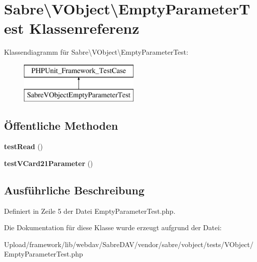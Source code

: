 \hypertarget{class_sabre_1_1_v_object_1_1_empty_parameter_test}{}\section{Sabre\textbackslash{}V\+Object\textbackslash{}Empty\+Parameter\+Test Klassenreferenz}
\label{class_sabre_1_1_v_object_1_1_empty_parameter_test}
Klassendiagramm für Sabre\textbackslash{}V\+Object\textbackslash{}Empty\+Parameter\+Test\+:\begin{figure}[H]
\begin{center}
\leavevmode
\includegraphics[height=2.000000cm]{class_sabre_1_1_v_object_1_1_empty_parameter_test}
\end{center}
\end{figure}
\subsection*{Öffentliche Methoden}
\begin{DoxyCompactItemize}
\item 
\mbox{\label{class_sabre_1_1_v_object_1_1_empty_parameter_test_a9bcf052fab49f0fa2138ad552aadc811}} 
{\bfseries test\+Read} ()
\item 
\mbox{\label{class_sabre_1_1_v_object_1_1_empty_parameter_test_a6fb4eda5c5ddb50c0bfa7da3dec37986}} 
{\bfseries test\+V\+Card21\+Parameter} ()
\end{DoxyCompactItemize}


\subsection{Ausführliche Beschreibung}


Definiert in Zeile 5 der Datei Empty\+Parameter\+Test.\+php.



Die Dokumentation für diese Klasse wurde erzeugt aufgrund der Datei\+:\begin{DoxyCompactItemize}
\item 
Upload/framework/lib/webdav/\+Sabre\+D\+A\+V/vendor/sabre/vobject/tests/\+V\+Object/Empty\+Parameter\+Test.\+php\end{DoxyCompactItemize}
